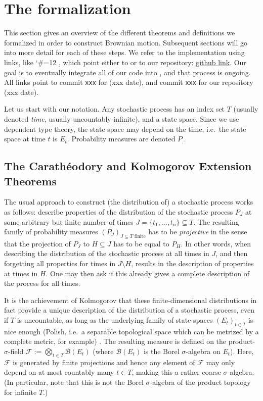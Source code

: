 \documentclass[lean]{Draft}
\makeatletter
\newcommand\leanlink{\begingroup\catcode`\#=12\relax\@leanlink}
\newcommand\@leanlink[2]{\endgroup
\href{#1}
{\texttt{\detokenize{#2}}}}
\newcommand{\docs}[1]{%
\leanlink{https://remydegenne.github.io/brownian-motion/docs/find/?pattern=#1\#doc}
{#1}}
\makeatother
\begin{document}
\section{The formalization}
This section gives an overview of the different theorems and definitions we formalized in order to construct Brownian motion. Subsequent sections will go into more detail for each of these steps.
We refer to the implementation using links, like \docs{ProbabilityTheory.IsGaussian}, which point either to \mathlib or to our repository: \href{https://github.com/RemyDegenne/brownian-motion}{github link}.
Our goal is to eventually integrate all of our code into \mathlib, and that process is ongoing.
All links point to commit {\tt xxx} for \mathlib (xxx date), and commit {\tt xxx} for our repository (xxx date).

Let us start with our notation.
Any stochastic process has an index set $T$ (usually denoted {\em time}, usually uncountably infinite), and a state space.
Since we use dependent type theory, the state space may depend on the time, i.e.\ the state space at time $t$ is $E_t$. Probability measures are denoted $P_.$.


\subsection{The Carathéodory and Kolmogorov Extension Theorems}
The usual approach to construct (the distribution of) a stochastic process works as follows: describe properties of the distribution of the stochastic process $P_J$ at some arbitrary but finite number of times $J = \{t_1,...,t_n\} \subseteq T$.
The resulting family of probability measures $(P_J)_{J \subseteq T \text{ finite}}$ has to be {\em projective} in the sense that the projection of $P_J$ to $H\subseteq J$ has to be equal to $P_H$. In other words, when describing the distribution of the stochastic process at all times in $J$, and then forgetting all properties for times in $J\setminus H$, results in the description of properties at times in $H$. One may then ask if this already gives a complete description of the process for all times.

It is the achievement of Kolmogorov that these finite-dimensional distributions in fact provide a unique description of the distribution of a stochastic process, even if $T$ is uncountable, as long as the underlying family of state spaces $(E_t)_{t\in T}$ is nice enough (Polish, i.e.\ a separable topological space which can be metrized by a complete metric, for example) \cite{kolmogoroff1933grundbegriffe}.
The resulting measure is defined on the product-$\sigma$-field $\mathcal F :=\bigotimes_{t\in T} \mathcal B(E_t)$ (where $\mathcal B(E_t)$ is the Borel $\sigma$-algebra on $E_t$). Here, $\mathcal F$ is generated by finite projections and hence any element of $\mathcal F$ may only depend on at most countably many $t\in T$, making this a rather coarse $\sigma$-algebra. (In particular, note that this is not the Borel $\sigma$-algebra of the product topology for infinite $T$.)
\end{document}
